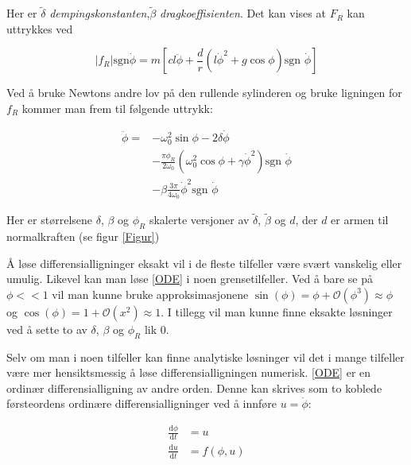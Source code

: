 \documentclass[5p]{elsarticle}
\newcommand{\dd}[2]{\frac{\mathrm{d}{#1}}{\mathrm{d}{#2}}}
\begin{document}
Her er \(\tilde{\delta}\) \textit{dempingskonstanten},\(\tilde{\beta}\) \textit{dragkoeffisienten}.
Det kan vises at \(F_R\) kan uttrykkes ved

\begin{equation}
	|f_R|\text{sgn}\dot{\phi} =
	m\left[
		cl\ddot{\phi}+\frac{d}{r}
		\left(l\dot{\phi}^2 + g\cos\phi\right)
		\text{sgn }\dot{\phi}
	\right]
\end{equation}

Ved å bruke Newtons andre lov på den rullende sylinderen 
og bruke ligningen for \(f_R\) kommer man frem til følgende uttrykk:

\begin{equation}
	\begin{split}
		\label{ODE}	
		\ddot{\phi} = 	
		&- \omega_0^2\sin\phi - 2\delta\dot{\phi}	\\
		&- \frac{\pi\phi_R}{2\omega_0}
		\left(\omega_0^2\cos\phi + \gamma\dot{\phi}^2\right) \text{sgn } \dot{\phi} \\
		&- \beta \frac{3\pi}{4\omega_0}\dot{\phi}^2\text{sgn }\dot{\phi} 
	\end{split}
\end{equation}

Her er størrelsene \(\delta\), \(\beta\) og \(\phi_R\) skalerte versjoner av 
\(\tilde{\delta}\), \(\tilde{\beta}\) og \(d\), der \(d\) er armen til normalkraften (se figur \ref{Figur})

Å løse differensialligninger eksakt vil i de fleste tilfeller være svært vanskelig eller umulig.
Likevel kan man løse \eqref{ODE} i noen grensetilfeller. Ved å bare se på \(\phi << 1\) vil man kunne
bruke approksimasjonene 
\(\sin(\phi) = \phi + \mathcal{O}(\phi^3) \approx \phi\) og 
\(\cos(\phi) = 1 + \mathcal{O}(x^2) \approx 1\).
I tillegg vil man kunne finne eksakte løsninger ved å sette to av \(\delta\), \(\beta\) og \(\phi_R\) lik 0.
\par
Selv om man i noen tilfeller kan finne analytiske løsninger 
vil det i mange tilfeller være mer hensiktsmessig å løse differensialligningen numerisk.
\eqref{ODE} er en ordinær differensialligning av andre orden. 
Denne kan skrives som to koblede førsteordens ordinære differensialligninger ved å innføre \(u = \dot{\phi}\):

\begin{subequations}
	\begin{align}
		\dd{\phi}{t} & = u \\
		\dd{u}{t}    & = f(\phi, u) \\
	\end{align}
\end{subequations}
\end{document}
